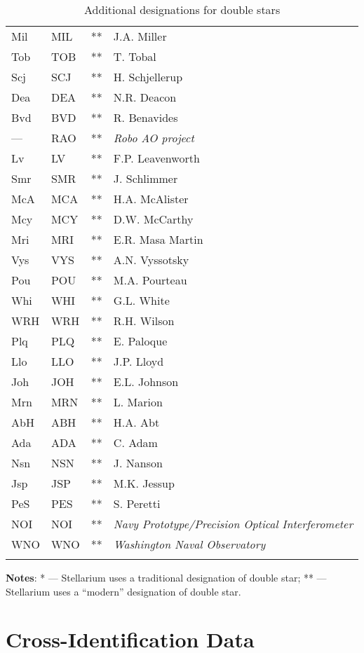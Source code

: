 \begin{longtable}{l|l|c|p{80mm}}
Mil		        	& MIL 	& ** & J.A. Miller \\
Tob		        	& TOB 	& ** & T. Tobal  \\
Scj		        	& SCJ 	& ** & H. Schjellerup \\
Dea		        	& DEA 	& ** & N.R. Deacon \\
Bvd		        	& BVD 	& ** & R. Benavides \\
---		        	& RAO 	& ** & \emph{Robo AO project} \\
Lv		        	& LV 	& ** & F.P. Leavenworth \\
Smr		        	& SMR 	& ** & J. Schlimmer \\
McA		        	& MCA 	& ** & H.A. McAlister \\
Mcy		        	& MCY 	& ** & D.W. McCarthy \\
Mri		        	& MRI 	& ** & E.R. Masa Martin \\
Vys		        	& VYS 	& ** & A.N. Vyssotsky \\
Pou		        	& POU 	& ** & M.A. Pourteau \\
Whi		        	& WHI 	& ** & G.L. White \\
WRH		        	& WRH 	& ** & R.H. Wilson \\
Plq		        	& PLQ 	& ** & E. Paloque \\
Llo		        	& LLO 	& ** & J.P. Lloyd \\
Joh		        	& JOH 	& ** & E.L. Johnson \\
Mrn		        	& MRN 	& ** & L. Marion \\
AbH		        	& ABH 	& ** & H.A. Abt \\
Ada		        	& ADA 	& ** & C. Adam \\
Nsn		        	& NSN 	& ** & J. Nanson \\
Jsp		        	& JSP 	& ** & M.K. Jessup \\
PeS		        	& PES 	& ** & S. Peretti \\
NOI		        	& NOI 	& ** & \emph{Navy Prototype/Precision Optical Interferometer} \\
WNO  	     		& WNO 	& ** & \emph{Washington Naval Observatory}  \\\bottomrule
\caption{Additional designations for double stars}
\label{tab:StarCatalogues:DoubleStars:Designations}
\end{longtable}
\textbf{Notes}: * --- Stellarium uses a traditional designation of double star; ** --- Stellarium uses a ``modern'' designation of double star.

\section{Cross-Identification Data}
\label{sec:StarCatalogues:CrossIdentificationData}

